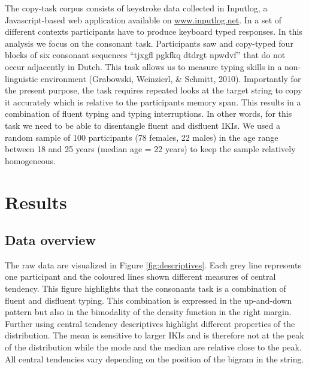 \documentclass[english,man,floatsintext]{apa7}
\begin{document}
The copy-task corpus consists of keystroke data collected in Inputlog, a Javascript-based web application available on \url{www.inputlog.net}. In a set of different contexts participants have to produce keyboard typed responses. In this analysis we focus on the consonant task. Participants saw and copy-typed four blocks of six consonant sequences \enquote{tjxgfl pgkfkq dtdrgt npwdvf} that do not occur adjacently in Dutch. This task allows us to measure typing skills in a non-linguistic environment (Grabowski, Weinzierl, \& Schmitt, 2010). Importantly for the present purpose, the task requires repeated looks at the target string to copy it accurately which is relative to the participants memory span. This results in a combination of fluent typing and typing interruptions. In other words, for this task we need to be able to disentangle fluent and disfluent IKIs. We used a random sample of 100 participants (78 females, 22 males) in the age range between 18 and 25 years (median age = 22 years) to keep the sample relatively homogeneous.

\hypertarget{results}{%
\section{Results}\label{results}}

\hypertarget{data-overview}{%
\subsection{Data overview}\label{data-overview}}

The raw data are visualized in Figure \ref{fig:descriptives}. Each grey line represents one participant and the coloured lines shown different measures of central tendency. This figure highlights that the consonants task is a combination of fluent and disfluent typing. This combination is expressed in the up-and-down pattern but also in the bimodality of the density function in the right margin. Further using central tendency descriptives highlight different properties of the distribution. The mean is sensitive to larger IKIs and is therefore not at the peak of the distribution while the mode and the median are relative close to the peak. All central tendencies vary depending on the position of the bigram in the string.
\end{document}
